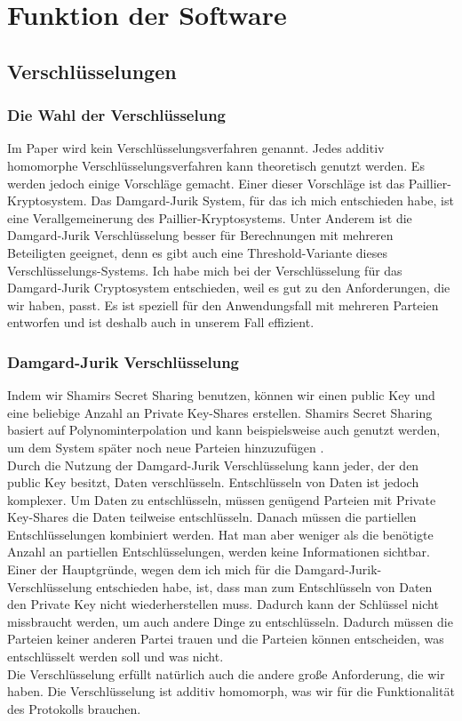 \chapter{Funktion der Software}

\section{Verschlüsselungen}
\subsection{Die Wahl der Verschlüsselung}
Im Paper \cite{Doettling2021} wird kein Verschlüsselungsverfahren genannt. Jedes additiv homomorphe Verschlüsselungsverfahren kann theoretisch genutzt werden. Es werden jedoch einige Vorschläge  gemacht. Einer dieser Vorschläge ist das Paillier-Kryptosystem. Das Damgard-Jurik System, für das ich mich entschieden habe, ist eine Verallgemeinerung des Paillier-Kryptosystems. Unter Anderem ist die Damgard-Jurik Verschlüsselung besser für Berechnungen mit mehreren Beteiligten geeignet, denn es gibt auch eine Threshold-Variante dieses Verschlüsselungs-Systems. \cite{IvanDamgard2004}
Ich habe mich bei der Verschlüsselung für das Damgard-Jurik Cryptosystem entschieden, weil es gut zu den Anforderungen, die wir haben, passt. Es ist speziell für den Anwendungsfall mit mehreren Parteien entworfen und ist deshalb auch in unserem Fall effizient.\\

\subsection{Damgard-Jurik Verschlüsselung}
Indem wir Shamirs Secret Sharing benutzen, können wir einen public Key und eine beliebige Anzahl an Private Key-Shares erstellen. Shamirs Secret Sharing basiert auf Polynominterpolation und kann beispielsweise auch genutzt werden, um dem System später noch neue Parteien hinzuzufügen \cite{Shamir1979}.\\
Durch die Nutzung der Damgard-Jurik Verschlüsselung kann jeder, der den public Key besitzt, Daten verschlüsseln. Entschlüsseln von Daten ist jedoch komplexer. Um Daten zu entschlüsseln, müssen genügend Parteien mit Private Key-Shares die Daten teilweise entschlüsseln. Danach müssen die partiellen Entschlüsselungen kombiniert werden. Hat man aber weniger als die benötigte Anzahl an partiellen Entschlüsselungen, werden keine Informationen sichtbar. \cite{IvanDamgard2004}\\
Einer der Hauptgründe, wegen dem ich mich für die Damgard-Jurik-Verschlüsselung entschieden habe, ist, dass man zum Entschlüsseln von Daten den Private Key nicht wiederherstellen muss. Dadurch kann der Schlüssel nicht missbraucht werden, um auch andere Dinge zu entschlüsseln. Dadurch müssen die Parteien keiner anderen Partei trauen und die Parteien können entscheiden, was entschlüsselt werden soll und was nicht. \cite{IvanDamgard2004}\\
Die Verschlüsselung erfüllt natürlich auch die andere große Anforderung, die wir haben. Die Verschlüsselung ist additiv homomorph, was wir für die Funktionalität des Protokolls brauchen. \cite{IvanDamgard2004}

